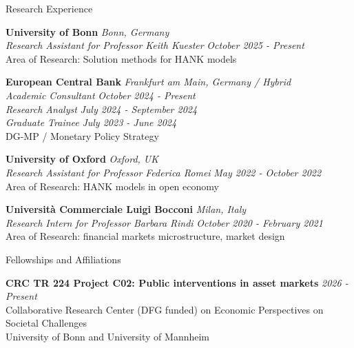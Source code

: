 \documentclass{resume} %
\begin{document}
\begin{rSection}{Research Experience}

{\bf University of Bonn} \hfill {\em Bonn, Germany} \\
\textit{Research Assistant for Professor Keith Kuester} \hfill {\em October 2025 - Present} \\
Area of Research: Solution methods for HANK models

{\bf European Central Bank} \hfill {\em Frankfurt am Main, Germany / Hybrid} \\
\textit{Academic Consultant} \hfill {\em October 2024 - Present} \\
\textit{Research Analyst} \hfill {\em July 2024 - September 2024} \\
\textit{Graduate Trainee} \hfill {\em July 2023 - June 2024} \\
DG-MP / Monetary Policy Strategy

{\bf University of Oxford} \hfill {\em Oxford, UK} \\
\textit{Research Assistant for Professor Federica Romei} \hfill {\em May 2022 - October 2022} \\
Area of Research: HANK models in open economy

{\bf Università Commerciale Luigi Bocconi} \hfill {\em Milan, Italy} \\
\textit{Research Intern for Professor Barbara Rindi} \hfill {\em October 2020 - February 2021} \\
Area of Research: financial markets microstructure, market design

\end{rSection}

\begin{rSection}{Fellowships and Affiliations}

{\bf CRC TR 224 Project C02: Public interventions in asset markets} \hfill {\em 2026 - Present} \\
Collaborative Research Center (DFG funded) on Economic Perspectives on Societal Challenges \\
University of Bonn and University of Mannheim

\end{rSection}
\end{document}
